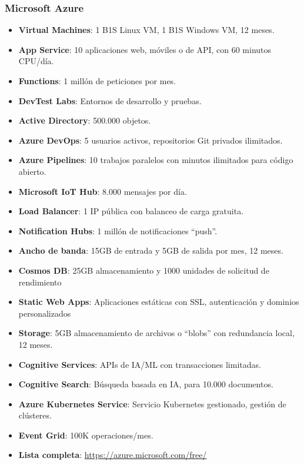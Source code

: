 \subsubsection*{Microsoft Azure}
\begin{itemize}
	\item \textbf{Virtual Machines}: 1 B1S Linux VM, 1 B1S Windows VM, 12 meses.
	\item \textbf{App Service}: 10 aplicaciones web, móviles o de API, con 60 minutos CPU/día.
	\item \textbf{Functions}: 1 millón de peticiones por mes.
	\item \textbf{DevTest Labs}: Entornos de desarrollo y pruebas.
	\item \textbf{Active Directory}: 500.000 objetos.
	\item \textbf{Azure DevOps}: 5 usuarios activos, repositorios Git privados ilimitados.
	\item \textbf{Azure Pipelines}: 10 trabajos paralelos con minutos ilimitados para código abierto.
	\item \textbf{Microsoft IoT Hub}: 8.000 mensajes por día.
	\item \textbf{Load Balancer}: 1 IP pública con balanceo de carga gratuita.
	\item \textbf{Notification Hubs}: 1 millón de notificaciones ``push''.
	\item \textbf{Ancho de banda}: 15GB de entrada y 5GB de salida por mes, 12 meses.
	\item \textbf{Cosmos DB}: 25GB almacenamiento y 1000 unidades de solicitud de rendimiento
	\item \textbf{Static Web Apps}: Aplicaciones estáticas con SSL, autenticación y dominios personalizados
	\item \textbf{Storage}: 5GB almacenamiento de archivos o ``blobs'' con redundancia local, 12 meses.
	\item \textbf{Cognitive Services}: APIs de IA/ML con transacciones limitadas.
	\item \textbf{Cognitive Search}: Búsqueda basada en IA, para 10.000 documentos.
	\item \textbf{Azure Kubernetes Service}: Servicio Kubernetes gestionado, gestión de clústeres.
	\item \textbf{Event Grid}: 100K operaciones/mes.
	\item \textbf{Lista completa}: \url{https://azure.microsoft.com/free/}
\end{itemize}


